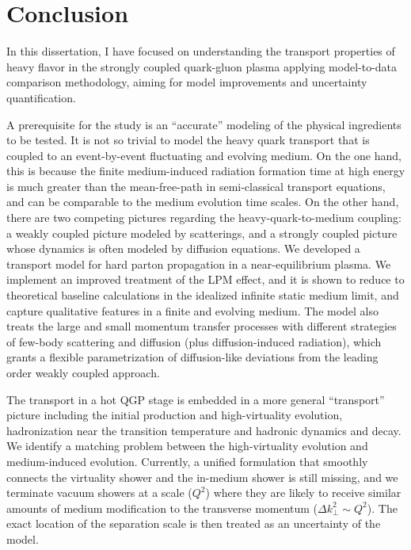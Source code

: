 \chapter{Conclusion}
\label{chapter:conclusion}
In this dissertation, I have focused on understanding the transport properties of heavy flavor in the strongly coupled quark-gluon plasma applying model-to-data comparison methodology, aiming for model improvements and uncertainty quantification.

A prerequisite for the study is an ``accurate'' modeling of the physical ingredients to be tested.
It is not so trivial to model the heavy quark transport that is coupled to an event-by-event fluctuating and evolving medium.
On the one hand, this is because the finite medium-induced radiation formation time at high energy is much greater than the mean-free-path in semi-classical transport equations, and can be comparable to the medium evolution time scales.
On the other hand, there are two competing pictures regarding the heavy-quark-to-medium coupling: a weakly coupled picture modeled by scatterings, and a strongly coupled picture whose dynamics is often modeled by diffusion equations.
We developed a transport model for hard parton propagation in a near-equilibrium plasma. 
We implement an improved treatment of the LPM effect, and it is shown to reduce to theoretical baseline calculations in the idealized infinite static medium limit, and capture qualitative features in a finite and evolving medium.
The model also treats the large and small momentum transfer processes with different strategies of few-body scattering and diffusion (plus diffusion-induced radiation), which grants a flexible parametrization of diffusion-like deviations from the leading order weakly coupled approach.

The transport in a hot QGP stage is embedded in a more general ``transport'' picture including the initial production and high-virtuality evolution, hadronization near the transition temperature and hadronic dynamics and decay.
We identify a matching problem between the high-virtuality evolution and medium-induced evolution.
Currently, a unified formulation that smoothly connects the virtuality shower and the in-medium shower is still missing, and we terminate vacuum showers at a scale ($Q^2$) where they are likely to receive similar amounts of medium modification to the transverse momentum ($\Delta k_\perp^2 \sim Q^2$).
The exact location of the separation scale is then treated as an uncertainty of the model.

